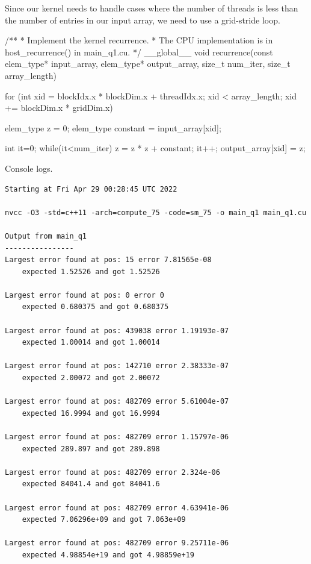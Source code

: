 \documentclass[12pt,letterpaper,twoside]{article}
\begin{document}
\begin{itemize}
    Since our kernel needs to handle cases where the number of threads is less 
    than the number of entries in our input array, we need to use a grid-stride 
    loop.

    \begin{cpp}
    /**
    * Implement the kernel recurrence.
    * The CPU implementation is in host_recurrence() in main_q1.cu.
    */
    __global__ void recurrence(const elem_type* input_array,
                               elem_type* output_array, 
                               size_t num_iter,
                               size_t array_length) {

        for (int xid = blockIdx.x * blockDim.x + threadIdx.x;
            xid < array_length;
            xid += blockDim.x * gridDim.x) {
        
            elem_type z = 0;
            elem_type constant = input_array[xid];

            int it=0;
            while(it<num_iter) {
            z = z * z + constant;
            it++;
            }
            output_array[xid] = z;
        }
    }
    \end{cpp}
    
    Console logs.
\begin{verbatim}
Starting at Fri Apr 29 00:28:45 UTC 2022

nvcc -O3 -std=c++11 -arch=compute_75 -code=sm_75 -o main_q1 main_q1.cu

Output from main_q1
----------------
Largest error found at pos: 15 error 7.81565e-08 
    expected 1.52526 and got 1.52526

Largest error found at pos: 0 error 0 
    expected 0.680375 and got 0.680375

Largest error found at pos: 439038 error 1.19193e-07 
    expected 1.00014 and got 1.00014

Largest error found at pos: 142710 error 2.38333e-07 
    expected 2.00072 and got 2.00072

Largest error found at pos: 482709 error 5.61004e-07 
    expected 16.9994 and got 16.9994

Largest error found at pos: 482709 error 1.15797e-06 
    expected 289.897 and got 289.898

Largest error found at pos: 482709 error 2.324e-06 
    expected 84041.4 and got 84041.6

Largest error found at pos: 482709 error 4.63941e-06 
    expected 7.06296e+09 and got 7.063e+09

Largest error found at pos: 482709 error 9.25711e-06 
    expected 4.98854e+19 and got 4.98859e+19


\end{verbatim}
\end{itemize}
\end{document}

